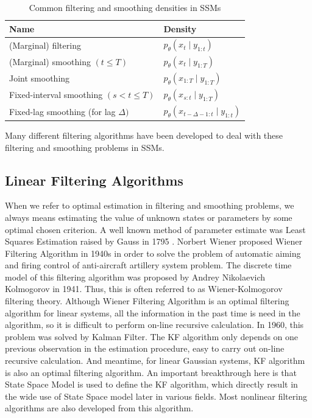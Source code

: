 \documentclass[mstat,12pt]{unswthesis}  %
\numberwithin{equation}{section}
\begin{document}
\begin{table}[H]
\centering
\begin{tabular}{ll}
\hline Name & Density \\
\hline (Marginal) filtering & $p_{\theta}\left(x_{t} \mid y_{1: t}\right)$ \\
(Marginal) smoothing $(t \leq T)$ & $p_{\theta}\left(x_{t} \mid y_{1: T}\right)$ \\
Joint smoothing & $p_{\theta}\left(x_{1: T} \mid y_{1: T}\right)$ \\
Fixed-interval smoothing $(s<t \leq T)$ & $p_{\theta}\left(x_{s: t} \mid y_{1: T}\right)$ \\
Fixed-lag smoothing (for lag $\Delta)$ & $p_{\theta}\left(x_{t-\Delta-1: t} \mid y_{1: t}\right)$ \\
\hline
\end{tabular}
\caption{Common filtering and smoothing densities in SSMs}
\label{table:fs}
\end{table}

\noindent Many different filtering algorithms have been developed to deal with these filtering and smoothing problems in SSMs.\\

\subsection{Linear Filtering Algorithms}
\noindent When we refer to optimal estimation in filtering and smoothing problems, we always means estimating the value of unknown states or parameters by some optimal chosen criterion.  
A well known method of parameter estimate was Least Squares Estimation raised by Gauss in 1795 \cite{stigler1981gauss,agrawal2018rewriting}.
Norbert Wiener proposed Wiener Filtering Algorithm in 1940s in order to solve the problem of automatic aiming and firing control of anti-aircraft artillery system problem\cite{wiener1949extrapolation}. The discrete time model of this  filtering algorithm was proposed by Andrey Nikolaevich
Kolmogorov in 1941\cite{kolmogoroff1941interpolation}.
Thus, this is often referred to as Wiener-Kolmogorov filtering
theory.  Although Wiener Filtering Algorithm is an optimal filtering algorithm for linear systems,
all the information in the past time is need in the algorithm, so it is difficult to perform on-line recursive calculation.
In 1960, this problem was solved by Kalman Filter\cite{kalman1960new}.
The KF algorithm only depends on one previous observation in the estimation procedure, easy to carry out on-line recursive calculation. And meantime, for linear Gaussian systems, KF algorithm is also an optimal filtering algorithm.
An important breakthrough here is that
State Space Model is used to define the KF algorithm, which
directly result in the wide use of State Space model later in various fields. Most nonlinear filtering algorithms are also developed from this algorithm.\\
\end{document}

